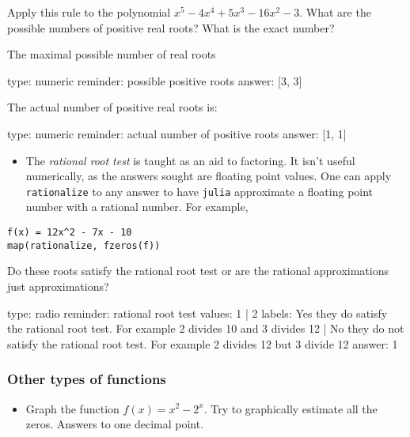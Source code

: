 \documentclass[12pt]{article}
\begin{document}
Apply this rule to the polynomial $x^5 - 4x^4 + 5x^3 - 16x^2 -   3$.
What are the possible numbers of positive real roots? What is the exact
number?

The maximal possible number of real roots

\begin{answer}
    type: numeric
    reminder: possible positive roots
    answer: [3, 3]

\end{answer}

The actual number of positive real roots is:

\begin{answer}
    type: numeric
    reminder: actual number of positive roots
    answer: [1, 1]

\end{answer}

\begin{itemize}
\itemsep1pt\parskip0pt
\item
  The \emph{rational root test} is taught as an aid to factoring. It
  isn't useful numerically, as the answers sought are floating point
  values. One can apply \texttt{rationalize} to any answer to have
  \texttt{julia} approximate a floating point number with a rational
  number. For example,
\end{itemize}



\begin{verbatim}
f(x) = 12x^2 - 7x - 10
map(rationalize, fzeros(f))
\end{verbatim}
Do these roots satisfy the rational root test or are the rational
approximations just approximations?

\begin{answer}
type: radio
reminder: rational root test
values: 1 | 2
labels: Yes they do satisfy the rational root test. For example 2 divides 10 and 3 divides 12 | No they do not satisfy the rational root test. For example 2 divides 12 but 3  divide 12
answer: 1
\end{answer}

\subsubsection{Other types of functions}

\begin{itemize}
\itemsep1pt\parskip0pt
\item
  Graph the function $f(x)= x^2 - 2^x$. Try to graphically estimate all
  the zeros. Answers to one decimal point.
\end{itemize}
\end{document}
